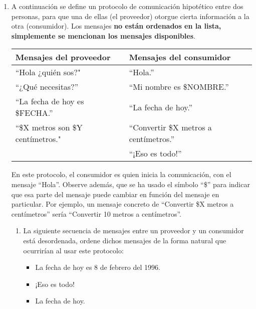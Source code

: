 \documentclass[12pt]{article}
\begin{document}
\begin{enumerate}

    \item A continuación se define un protocolo de comunicación hipotético
        entre dos personas, para que una de ellas (el proveedor) otorgue
        cierta información a la otra (consumidor). Los mensajes \textbf{no
        están ordenados en la lista, simplemente se mencionan los mensajes
        disponibles}.

        \begin{tabular}{|l|l|}
            \hline
            \textbf{Mensajes del proveedor} & \textbf{Mensajes del
            consumidor}\\
            \hline
            ``Hola ¿quién sos?" & ``Hola.''\\
            ``¿Qué necesitas?'' & ``Mi nombre es \$NOMBRE.''\\
            ``La fecha de hoy es \$FECHA.'' & ``La fecha de hoy.''\\
            ``\$X metros son \$Y centímetros." & ``Convertir \$X metros a
            centímetros.''\\
            & ``¡Eso es todo!''\\
            \hline
        \end{tabular}

        En este protocolo, el consumidor es quien inicia la comunicación, con
        el mensaje ``Hola''. Observe además, que se ha usado el símbolo ``\$''
        para indicar que esa parte del mensaje puede cambiar en función del
        mensaje en particular. Por ejemplo, un mensaje concreto de ``Convertir
        \$X metros a centímetros'' sería ``Convertir 10 metros a
        centímetros''.

    \begin{enumerate}

        \item La siguiente secuencia de mensajes entre un proveedor y un
            consumidor está desordenada, ordene dichos mensajes de la forma
            natural que ocurrirían al usar este protocolo:

        \begin{itemize}

            \item La fecha de hoy es 8 de febrero del 1996.

            \item ¡Eso es todo!

            \item La fecha de hoy.


\end{itemize}
\end{enumerate}
\end{enumerate}
\end{document}
